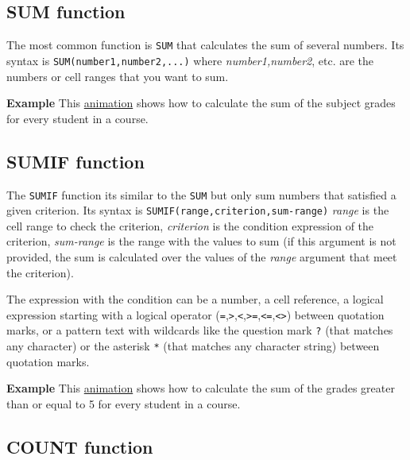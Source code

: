 \subsection{SUM function}\hypertarget{sum-function}{}\label{sum-function}

The most common function is \texttt{SUM} that calculates the sum of several numbers. Its syntax is \texttt{SUM(number1,number2,...)} where \emph{number1,number2}, etc. are the numbers or cell ranges that you want to sum.

\textbf{Example} This \href{http://aprendeconalf.es/office/excel/manual/img/example_function_sum.gif}{animation} shows how to calculate the sum of the subject grades for every student in a course.

\subsection{SUMIF function}\hypertarget{sumif-function}{}\label{sumif-function}

The \texttt{SUMIF} function its similar to the \texttt{SUM} but only sum numbers that satisfied a given criterion. Its syntax is \texttt{SUMIF(range,criterion,sum-range)} \emph{range} is the cell range to check the criterion, \emph{criterion} is the condition expression of the criterion, \emph{sum-range} is the range with the values to sum (if this argument is not provided, the sum is calculated over the values of the \emph{range} argument that meet the criterion).

The expression with the condition can be a number, a cell reference, a logical expression starting with a logical operator (\texttt{=},\texttt{\textgreater{}},\texttt{\textless{}},\texttt{\textgreater{}=},\texttt{\textless{}=},\texttt{\textless{}\textgreater{}}) between quotation marks, or a pattern text with wildcards like the question mark \texttt{?} (that matches any character) or the asterisk \texttt{*} (that matches any character string) between quotation marks.

\textbf{Example} This \href{http://aprendeconalf.es/office/excel/manual/img/example_function_sumif.gif}{animation} shows how to calculate the sum of the grades greater than or equal to 5 for every student in a course.

\subsection{COUNT function}\hypertarget{count-function}{}\label{count-function}


